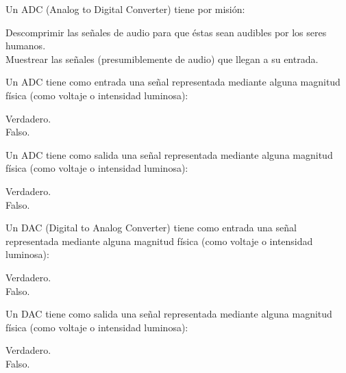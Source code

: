 \documentclass[legalpaper, 12pt, addpoints]{exam}
\begin{document}
\begin{questions}
\vspace{0.10in}

\question Un ADC (Analog to Digital Converter) tiene por misión:

\begin{oneparchoices}
  \choice Descomprimir las señales de audio para que éstas sean audibles por los seres humanos.\\
  \choice Muestrear las señales (presumiblemente de audio) que llegan a su entrada.
\end{oneparchoices}
  
\vspace{0.10in}

\question Un ADC tiene como entrada una señal representada mediante
alguna magnitud física (como voltaje o intensidad luminosa):

\begin{oneparchoices}
  \choice Verdadero.\\
  \choice Falso.
\end{oneparchoices}
  
\vspace{0.10in}

\question Un ADC tiene como salida una señal representada mediante
alguna magnitud física (como voltaje o intensidad luminosa):

\begin{oneparchoices}
  \choice Verdadero.\\
  \choice Falso.
\end{oneparchoices}

\question Un DAC (Digital to Analog Converter) tiene como entrada una
señal representada mediante alguna magnitud física (como voltaje o
intensidad luminosa):

\begin{oneparchoices}
  \choice Verdadero.\\
  \choice Falso.
\end{oneparchoices}
  
\vspace{0.10in}

\question Un DAC tiene como salida una señal representada mediante
alguna magnitud física (como voltaje o intensidad luminosa):

\begin{oneparchoices}
  \choice Verdadero.\\
  \choice Falso.
\end{oneparchoices}
  
\vspace{0.10in}


\end{questions}
\end{document}
